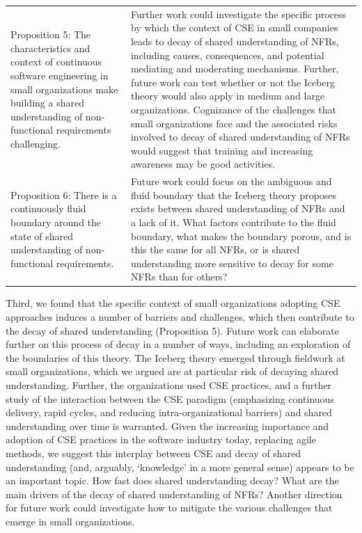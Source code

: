 \documentclass[smallextended]{svjour3}
\begin{document}
\begin{table}[!h]
\begin{tabular}{p{4cm}p{7.7cm}}
\addlinespace 

Proposition 5: The characteristics and context of continuous software engineering in small organizations make building a shared understanding of non-functional requirements challenging. 
& 
Further work could investigate the specific process by which the context of CSE in small companies leads to decay of shared understanding of NFRs, including causes, consequences, and potential mediating and moderating mechanisms. Further, future work can test whether or not the Iceberg theory would also apply in medium and large organizations. Cognizance of the challenges that small organizations face and the associated risks involved to decay of shared understanding of NFRs would suggest that training and increasing awareness may be good activities.
\\

\addlinespace 

Proposition 6: There is a continuously fluid boundary around the state of
shared understanding of non-functional requirements.
& 
Future work could focus on the ambiguous and fluid boundary that the Iceberg theory proposes exists between shared understanding of NFRs and a lack of it. What factors contribute to the fluid boundary, what makes the boundary porous, and is this the same for all NFRs, or is shared understanding more sensitive to decay for some NFRs than for others? \\

\bottomrule 
         
\end{tabular}
    
\end{table}


Third, we found that the specific context of small organizations adopting CSE approaches induces a number of barriers and challenges, which then contribute to the decay of shared understanding (Proposition 5). Future work can elaborate further on this process of decay in a number of ways, including an exploration of the boundaries of this theory. The Iceberg theory emerged through fieldwork at small organizations, which we argued are at particular risk of decaying shared understanding. Further, the organizations used CSE practices, and a further study of the interaction between the CSE paradigm (emphasizing continuous delivery, rapid cycles, and reducing intra-organizational barriers) and shared understanding over time is warranted. Given the increasing importance and adoption of CSE practices in the software industry today, replacing agile methods, we suggest this interplay between CSE and 
decay of shared understanding (and, arguably, `knowledge' in a more general sense) appears to be an important topic.
How fast does shared understanding decay? What are the main drivers of the decay of shared understanding of NFRs?
Another direction for future work could investigate how to mitigate the various challenges that emerge in small organizations. 
\end{document}
